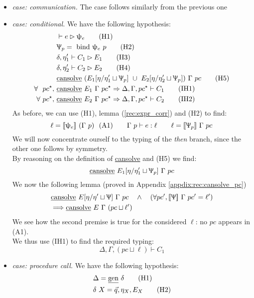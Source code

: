 \documentclass[12pt,a4paper,twoside]{book}
\newcommand{\llbracket}{[\![}
\newcommand{\rrbracket}{]\!]}
\begin{document}
\begin{itemize}
\item\emph{case: communication.} The case follows similarly from the previous one
\item\emph{case: conditional.} We have the following hypothesis:
\begin{align}
&\vdash e \rhd \uppsi_e \tag{H1}\\
&\Uppsi_p =~\text{bind}~\uppsi_e~p\tag{H2}\\
&\delta, \eta_1' \vdash C_1 \rhd E_1 \tag{H3}\\
&\delta, \eta_2' \vdash C_2 \rhd E_2 \tag{H4}\\
&\text{\underline{cansolve}}~(E_1[\eta/\eta_1' \sqcup \Uppsi_p] ~\cup~ E_2[\eta/\eta_2' \sqcup \Uppsi_p])~\Gamma~pc \tag{H5}\\
\forall~~pc^\star,~&\text{\underline{cansolve}}~E_1~\Gamma~pc^\star \Rightarrow \Delta, \Gamma, pc^\star \vdash C_1 \tag{IH1}\\
\forall~pc^\star,~&\text{\underline{cansolve}}~E_2~\Gamma~pc^\star \Rightarrow \Delta, \Gamma, pc^\star \vdash C_2 \tag{IH2}
\end{align}
As before, we can use (H1), lemma (\ref{rec:expr_corr}) and (H2) to find:
$$
\ell = \llbracket \uppsi_e \rrbracket~(\Gamma~p)~~(\text{A1})
\quad\quad
\Gamma~p\vdash e:\ell
\quad\quad
\ell = \llbracket \Uppsi_p \rrbracket~\Gamma~pc
$$
We will now concentrate ourself to the typing of the \emph{then} branch, since the other one follows by symmetry.\\
By reasoning on the definition of \underline{cansolve} and (H5) we find:
$$
\text{\underline{cansolve}}~E_1[\eta/\eta_1' \sqcup \Uppsi_p]~\Gamma~pc
$$
We now the following lemma (proved in Appendix \ref{appdix:rec:cansolve_pc})
\begin{align*}
&\text{\underline{cansolve}}~E[\eta/\eta' \sqcup \Uppsi]~\Gamma~pc
\quad\land\quad (\forall pc', \llbracket \Uppsi \rrbracket~\Gamma~pc'=\ell')\\
&\Longrightarrow \text{\underline{cansolve}}~E~\Gamma~(pc\sqcup\ell')
\end{align*}
We see how the second premise is true for the considered $\ell$: no $pc$ appears in (A1).\\
We thus use (IH1) to find the required typing:
$$
\Delta, \Gamma, (pc \sqcup \ell) \vdash C_1
$$
\item\emph{case: procedure call.} We have the following hypothesis:
\begin{align*}
	&\Delta = \text{\underline{gen}}~\delta\tag{H1}\\
	&\delta~X = \vec{q}, \eta_X, E_X \tag{H2}\\

\end{align*}
\end{itemize}
\end{document}

